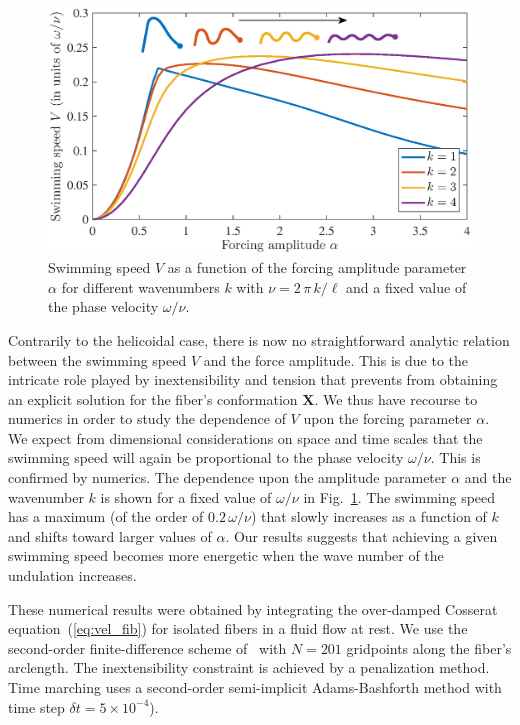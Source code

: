 \documentclass[aps,pre,reprint,superscriptaddress]{revtex4-2}
\newcommand{\bX}{\bm X}
\begin{document}
\begin{figure}[ht]
  \centerline{\includegraphics[width=\columnwidth]{swimming_speed_nofluid}}
  \caption{\label{fig:swimming_speed_nofluid} Swimming speed $V$ as a function of the forcing amplitude parameter $\alpha$ for different wavenumbers $k$ with $\nu = 2\,\pi\,k/\ell$ and a fixed value of the phase velocity $\omega/\nu$.}
\end{figure}
Contrarily to the helicoidal case, there is now no straightforward analytic relation between the swimming speed $V$ and the force amplitude. This is due to the intricate role played by inextensibility and tension that prevents from obtaining an explicit solution for the fiber's conformation $\bX$. We thus have recourse to numerics in order to study the dependence of $V$ upon the forcing parameter $\alpha$. We expect from dimensional considerations on space and time scales that the swimming speed will again be proportional to the phase velocity $\omega/\nu$. This is confirmed by numerics. The dependence upon the amplitude parameter $\alpha$ and the wavenumber $k$ is shown for a fixed value of $\omega/\nu$ in Fig.~\ref{fig:swimming_speed_nofluid}. The swimming speed has a maximum (of the order of $0.2\,\omega/\nu$) that slowly increases as a function of $k$ and shifts toward larger values of $\alpha$. Our results suggests that achieving a given swimming speed becomes more energetic when the wave number of the undulation increases.

These numerical results were obtained by integrating the over-damped Cosserat equation~(\ref{eq:vel_fib}) for isolated fibers in a fluid flow at rest. We use the second-order finite-difference scheme of~\cite{tornberg2004simulating} with $N=201$ gridpoints along the fiber's arclength. The inextensibility constraint is achieved by a penalization method. Time marching uses a second-order semi-implicit Adams-Bashforth method with time step $\delta t = 5\times10^{-4}$).
\end{document}
